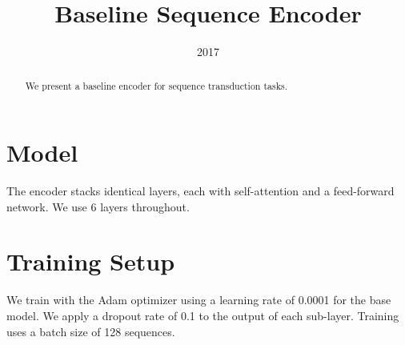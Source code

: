 \documentclass{article}
\title{Baseline Sequence Encoder}
\date{2017}
\begin{document}
\begin{abstract}
We present a baseline encoder for sequence transduction tasks.
\end{abstract}

\section{Model}
The encoder stacks identical layers, each with self-attention and a
feed-forward network. We use 6 layers throughout.

\section{Training Setup}
We train with the Adam optimizer using a learning rate of 0.0001 for the base
model. We apply a dropout rate of 0.1 to the output of each sub-layer. Training
uses a batch size of 128 sequences.
\end{document}
